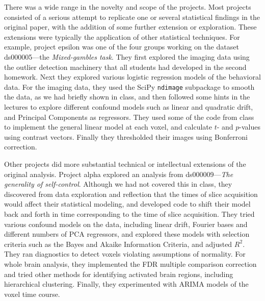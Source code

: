 There was a wide range in the novelty and scope of the projects.  Most
projects consisted of a serious attempt to replicate one or several
statistical findings in the original paper, with the addition of some further
extension or exploration.  These extensions were typically the application of
other statistical techniques.  For example, project epsilon was one of the
four groups working on the dataset ds000005---the \textit{Mixed-gambles
task}.  They first explored the imaging data using the outlier detection
machinery that all students had developed in the second homework.  Next they
explored various logistic regression models of the behavioral data.  For the
imaging data, they used the SciPy \texttt{ndimage} subpackage to smooth the
data, as we had briefly shown in class, and then followed some hints in the
lectures to explore different confound models such as linear and quadratic
drift, and Principal Components as regressors.  They used some of the code
from class to implement the general linear model at each voxel, and calculate
$t$- and $p$-values using contrast vectors.  Finally they thresholded their images
using Bonferroni correction.

Other projects did more substantial technical or intellectual extensions of
the original analysis.  Project alpha explored an analysis from
ds000009---\textit{The generality of self-control}.  Although we had not covered this in
class, they discovered from data exploration and reflection that the times of
slice acquisition would affect their statistical modeling, and developed code
to shift their model back and forth in time corresponding to the time of slice
acquisition.  They tried various confound models on the data, including linear
drift, Fourier bases and different numbers of PCA regressors, and explored
these models with selection criteria such as the Bayes and Akaike Information
Criteria, and adjusted $R^2$.  They ran diagnostics to detect voxels violating
assumptions of normality. For whole brain analysis, they implemented the FDR
multiple comparison correction and tried other methods for identifying
activated brain regions, including hierarchical clustering.  Finally, they
experimented with ARIMA models of the voxel time course.

